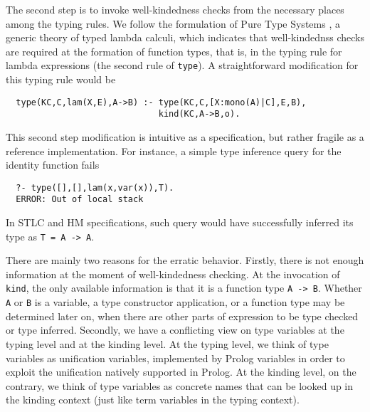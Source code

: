 \documentclass[runningheads,a4paper]{llncs}
\begin{document}
The second step is to invoke well-kindedness checks from the necessary
places among the typing rules. We follow the formulation of Pure Type
Systems \cite{Barendregt91}, a generic theory of typed lambda calculi,
which indicates that well-kindednss checks are required at the
formation of function types, that is, in the typing rule for lambda
expressions (the second rule of \verb|type|).
A straightforward modification for this typing rule would be
\begin{verbatim}
  type(KC,C,lam(X,E),A->B) :- type(KC,C,[X:mono(A)|C],E,B),
                              kind(KC,A->B,o).
\end{verbatim}
This second step modification is intuitive as a specification, but
rather fragile as a reference implementation. For instance,
a simple type inference query for the identity function fails
\begin{verbatim}
  ?- type([],[],lam(x,var(x)),T).
  ERROR: Out of local stack
\end{verbatim}
In STLC and HM specifications, such query would have successfully
inferred its type as \verb|T = A -> A|.

There are mainly two reasons for the erratic behavior.
Firstly, there is not enough information at the moment of
well-kindedness checking. At the invocation of \verb|kind|,
the only available information is that it is a function type \verb|A -> B|.
Whether \verb|A| or \verb|B| is a variable, a type constructor application,
or a function type may be determined later on, when there are other parts
of expression to be type checked or type inferred. Secondly, we have
a conflicting view on type variables at the typing level and
at the kinding level. At the typing level, we think of type variables as
unification variables, implemented by Prolog variables in order to exploit
the unification natively supported in Prolog. At the kinding level,
on the contrary, we think of type variables as concrete names that
can be looked up in the kinding context (just like term variables
in the typing context).
\end{document}
